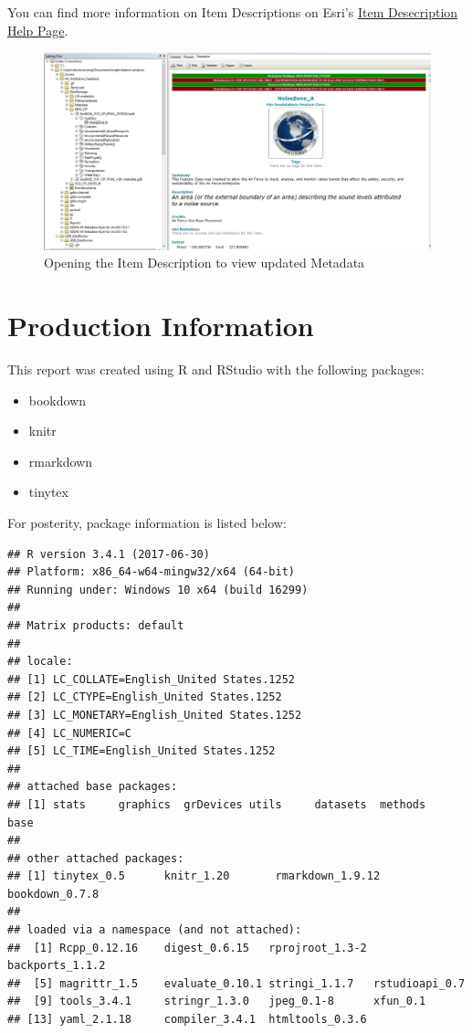 \documentclass[openany]{book}
\providecommand{\tightlist}{%
  \setlength{\itemsep}{0pt}\setlength{\parskip}{0pt}}
\theoremstyle{definition}
\theoremstyle{definition}
\theoremstyle{definition}
\theoremstyle{remark}
\begin{document}
You can find more information on Item Descriptions on Esri's
\href{http://desktop.arcgis.com/en/arcmap/latest/map/working-with-arcmap/documenting-items-in-the-catalog-window.htm}{Item
Desecription Help Page}.

\begin{figure}[H]

{\centering \includegraphics[width=0.8\linewidth,]{figures/imMetaArc-after} 

}

\caption{Opening the Item Description to view updated Metadata}\label{fig:imMetaArcafter}
\end{figure}

\chapter{Production Information}\label{prodInfo}

This report was created using R \citep{R-base} and RStudio
\citep{Rstudio} with the following packages:

\begin{itemize}
\tightlist
\item
  bookdown \citep{R-bookdown}
\item
  knitr \citep{R-knitr}
\item
  rmarkdown \citep{R-rmarkdown}
\item
  tinytex \citep{R-tinytex}
\end{itemize}

For posterity, package information is listed below:

\begin{verbatim}
## R version 3.4.1 (2017-06-30)
## Platform: x86_64-w64-mingw32/x64 (64-bit)
## Running under: Windows 10 x64 (build 16299)
## 
## Matrix products: default
## 
## locale:
## [1] LC_COLLATE=English_United States.1252 
## [2] LC_CTYPE=English_United States.1252   
## [3] LC_MONETARY=English_United States.1252
## [4] LC_NUMERIC=C                          
## [5] LC_TIME=English_United States.1252    
## 
## attached base packages:
## [1] stats     graphics  grDevices utils     datasets  methods   base     
## 
## other attached packages:
## [1] tinytex_0.5      knitr_1.20       rmarkdown_1.9.12 bookdown_0.7.8  
## 
## loaded via a namespace (and not attached):
##  [1] Rcpp_0.12.16    digest_0.6.15   rprojroot_1.3-2 backports_1.1.2
##  [5] magrittr_1.5    evaluate_0.10.1 stringi_1.1.7   rstudioapi_0.7 
##  [9] tools_3.4.1     stringr_1.3.0   jpeg_0.1-8      xfun_0.1       
## [13] yaml_2.1.18     compiler_3.4.1  htmltools_0.3.6
\end{verbatim}


\end{document}
